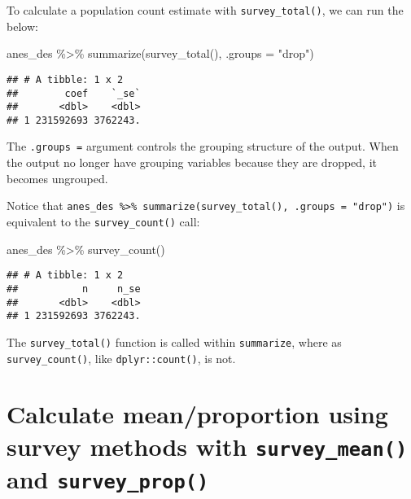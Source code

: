 \documentclass[
]{krantz}
\makeatletter
\newenvironment{Shaded}{\begin{snugshade}}{\end{snugshade}}
\newcommand{\AttributeTok}[1]{\textcolor[rgb]{0.61,0.61,0.61}{#1}}
\newcommand{\FunctionTok}[1]{\textcolor[rgb]{0,0,0}{#1}}
\newcommand{\NormalTok}[1]{#1}
\newcommand{\SpecialCharTok}[1]{\textcolor[rgb]{0,0,0}{#1}}
\newcommand{\StringTok}[1]{\textcolor[rgb]{0.5,0.5,0.5}{#1}}
\newenvironment{kframe}{%
\medskip{}
\setlength{\fboxsep}{.8em}
 \def\at@end@of@kframe{}%
 \ifinner\ifhmode%
  \def\at@end@of@kframe{\end{minipage}}%
  \begin{minipage}{\columnwidth}%
 \fi\fi%
 \def\FrameCommand##1{\hskip\@totalleftmargin \hskip-\fboxsep
 \colorbox{shadecolor}{##1}\hskip-\fboxsep
     \hskip-\linewidth \hskip-\@totalleftmargin \hskip\columnwidth}%
 \MakeFramed {\advance\hsize-\width
   \@totalleftmargin\z@ \linewidth\hsize
   \@setminipage}}%
 {\par\unskip\endMakeFramed%
 \at@end@of@kframe}
\renewenvironment{Shaded}{\begin{kframe}}{\end{kframe}}
\makeatother
\begin{document}
To calculate a population count estimate with \texttt{survey\_total()}, we can run the below:

\begin{Shaded}
\begin{Highlighting}[]
\NormalTok{anes\_des }\SpecialCharTok{\%\textgreater{}\%}
  \FunctionTok{summarize}\NormalTok{(}\FunctionTok{survey\_total}\NormalTok{(), }\AttributeTok{.groups =} \StringTok{"drop"}\NormalTok{)}
\end{Highlighting}
\end{Shaded}

\begin{verbatim}
## # A tibble: 1 x 2
##        coef    `_se`
##       <dbl>    <dbl>
## 1 231592693 3762243.
\end{verbatim}

The \texttt{.groups\ =} argument controls the grouping structure of the output. When the output no longer have grouping variables because they are dropped, it becomes ungrouped.

Notice that \texttt{anes\_des\ \%\textgreater{}\%\ summarize(survey\_total(),\ .groups\ =\ "drop")} is equivalent to the \texttt{survey\_count()} call:

\begin{Shaded}
\begin{Highlighting}[]
\NormalTok{anes\_des }\SpecialCharTok{\%\textgreater{}\%}
  \FunctionTok{survey\_count}\NormalTok{() }
\end{Highlighting}
\end{Shaded}

\begin{verbatim}
## # A tibble: 1 x 2
##           n     n_se
##       <dbl>    <dbl>
## 1 231592693 3762243.
\end{verbatim}

The \texttt{survey\_total()} function is called within \texttt{summarize}, where as \texttt{survey\_count()}, like \texttt{dplyr::count()}, is not.

\hypertarget{calculate-meanproportion-using-survey-methods-with-survey_mean-and-survey_prop}{%
\section{\texorpdfstring{Calculate mean/proportion using survey methods with \texttt{survey\_mean()} and \texttt{survey\_prop()}}{Calculate mean/proportion using survey methods with survey\_mean() and survey\_prop()}}\label{calculate-meanproportion-using-survey-methods-with-survey_mean-and-survey_prop}}
\end{document}
